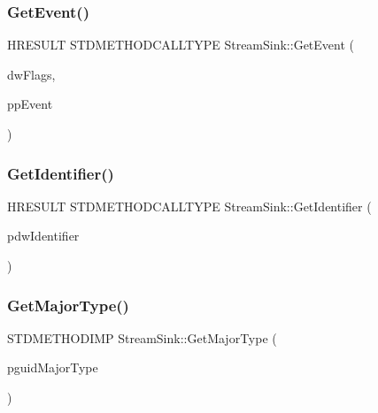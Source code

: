 \mbox{\label{class_stream_sink_a5b5fed15133cf2cd9c9df8f9266fdd9a}} 
\subsubsection{\texorpdfstring{Get\+Event()}{GetEvent()}}
{\footnotesize\ttfamily H\+R\+E\+S\+U\+LT S\+T\+D\+M\+E\+T\+H\+O\+D\+C\+A\+L\+L\+T\+Y\+PE Stream\+Sink\+::\+Get\+Event (\begin{DoxyParamCaption}\item[{D\+W\+O\+RD}]{dw\+Flags,  }\item[{I\+M\+F\+Media\+Event $\ast$$\ast$}]{pp\+Event }\end{DoxyParamCaption})\hspace{0.3cm}{\ttfamily [inline]}}

\mbox{\label{class_stream_sink_ac1cb36f22ea8d9d9c3c3c7900b2851cb}} 
\subsubsection{\texorpdfstring{Get\+Identifier()}{GetIdentifier()}}
{\footnotesize\ttfamily H\+R\+E\+S\+U\+LT S\+T\+D\+M\+E\+T\+H\+O\+D\+C\+A\+L\+L\+T\+Y\+PE Stream\+Sink\+::\+Get\+Identifier (\begin{DoxyParamCaption}\item[{\+\_\+\+\_\+\+R\+P\+C\+\_\+\+\_\+out D\+W\+O\+RD $\ast$}]{pdw\+Identifier }\end{DoxyParamCaption})\hspace{0.3cm}{\ttfamily [inline]}}

\mbox{\label{class_stream_sink_a35912937be501d6cc900d4adda1e615b}} 
\subsubsection{\texorpdfstring{Get\+Major\+Type()}{GetMajorType()}}
{\footnotesize\ttfamily S\+T\+D\+M\+E\+T\+H\+O\+D\+I\+MP Stream\+Sink\+::\+Get\+Major\+Type (\begin{DoxyParamCaption}\item[{G\+U\+ID $\ast$}]{pguid\+Major\+Type }\end{DoxyParamCaption})\hspace{0.3cm}{\ttfamily [inline]}}

